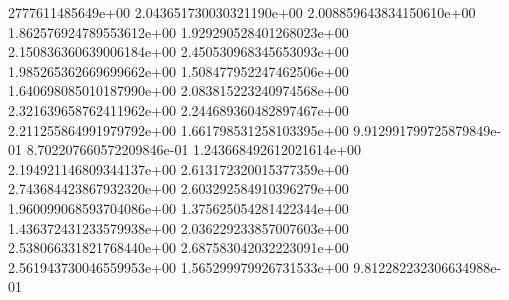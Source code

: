 2777611485649e+00	2.043651730030321190e+00	2.008859643834150610e+00	1.862576924789553612e+00	1.929290528401268023e+00	2.150836360639006184e+00	2.450530968345653093e+00	1.985265362669699662e+00	1.508477952247462506e+00	1.640698085010187990e+00	2.083815223240974568e+00	2.321639658762411962e+00	2.244689360482897467e+00	2.211255864991979792e+00	1.661798531258103395e+00	9.912991799725879849e-01	8.702207660572209846e-01	1.243668492612021614e+00	2.194921146809344137e+00	2.613172320015377359e+00	2.743684423867932320e+00	2.603292584910396279e+00	1.960099068593704086e+00	1.375625054281422344e+00	1.436372431233579938e+00	2.036229233857007603e+00	2.538066331821768440e+00	2.687583042032223091e+00	2.561943730046559953e+00	1.565299979926731533e+00	9.812282232306634988e-01
